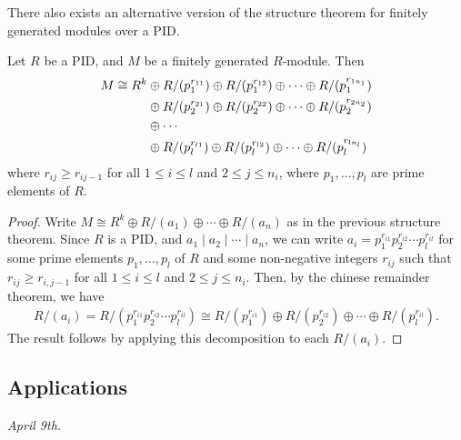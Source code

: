 There also exists an alternative version of the structure theorem for finitely generated modules over a PID.

\begin{theorem}
    Let $R$ be a PID, and $M$ be a finitely generated $R$-module. Then
    \begin{align}
        M \cong R^{k} &\oplus R/(p_{1}^{r_{11}}) \oplus R/(p_{1}^{r_{12}}) \oplus \cdots \oplus R/(p_{1}^{r_{1n_{1}}}) \notag \\
        &\oplus R/(p_{2}^{r_{21}}) \oplus R/(p_{2}^{r_{22}}) \oplus \cdots \oplus R/(p_{2}^{r_{2n_{2}}}) \notag \\
        &\oplus \cdots \notag \\
        &\oplus R/(p_{l}^{r_{l1}}) \oplus R/(p_{l}^{r_{l2}}) \oplus \cdots \oplus R/(p_{l}^{r_{ln_{l}}})
    \end{align}
    where $r_{ij} \geq r_{ij-1}$ for all $1 \leq i \leq l$ and $2 \leq j \leq n_{i}$, where $p_{1},\ldots,p_{l}$ are prime elements of $R$.
\end{theorem}

\begin{proof}
    Write $M \cong R^{k} \oplus R/(a_{1}) \oplus \cdots \oplus R/(a_{n})$ as in the previous structure theorem. Since $R$ is a PID, and $a_{1} \mid a_{2} \mid \cdots \mid a_{n}$, we can write $a_{i} = p_{1}^{r_{i1}}p_{2}^{r_{i2}} \cdots p_{l}^{r_{il}}$ for some prime elements $p_{1},\ldots,p_{l}$ of $R$ and some non-negative integers $r_{ij}$ such that $r_{ij} \geq r_{i,j-1}$ for all $1 \leq i \leq l$ and $2 \leq j \leq n_{i}$. Then, by the chinese remainder theorem, we have
    \begin{align}
        R/(a_{i}) = R/(p_{1}^{r_{i1}}p_{2}^{r_{i2}} \cdots p_{l}^{r_{il}}) \cong R/(p_{1}^{r_{i1}}) \oplus R/(p_{2}^{r_{i2}}) \oplus \cdots \oplus R/(p_{l}^{r_{il}}).
    \end{align}
    The result follows by applying this decomposition to each $R/(a_{i})$.
\end{proof}


\subsection{Applications}
\textit{April 9th.}


